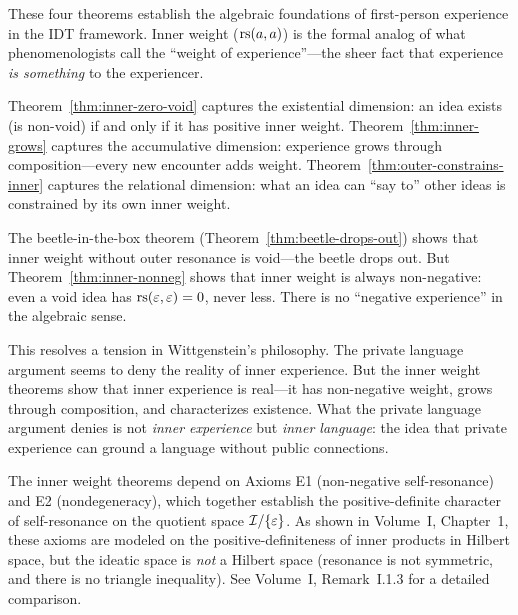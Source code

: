 \begin{interpretation}
These four theorems establish the algebraic foundations of first-person
experience in the IDT framework. Inner weight ($\mathrm{rs}(a, a)$) is the formal
analog of what phenomenologists call the ``weight of experience''---the
sheer fact that experience \emph{is something} to the experiencer.

Theorem~\ref{thm:inner-zero-void} captures the existential dimension: an
idea exists (is non-void) if and only if it has positive inner weight.
Theorem~\ref{thm:inner-grows} captures the accumulative dimension: experience
grows through composition---every new encounter adds weight.
Theorem~\ref{thm:outer-constrains-inner} captures the relational dimension:
what an idea can ``say to'' other ideas is constrained by its own inner weight.

The beetle-in-the-box theorem (Theorem~\ref{thm:beetle-drops-out}) shows
that inner weight without outer resonance is void---the beetle drops out.
But Theorem~\ref{thm:inner-nonneg} shows that inner weight is always
non-negative: even a void idea has $\mathrm{rs}(\varepsilon, \varepsilon) = 0$, never less.
There is no ``negative experience'' in the algebraic sense.

This resolves a tension in Wittgenstein's philosophy. The private language
argument seems to deny the reality of inner experience. But the inner weight
theorems show that inner experience is real---it has non-negative weight,
grows through composition, and characterizes existence. What the private
language argument denies is not \emph{inner experience} but \emph{inner
language}: the idea that private experience can ground a language without
public connections.
\end{interpretation}

\begin{remark}
The inner weight theorems depend on Axioms E1 (non-negative self-resonance)
and E2 (nondegeneracy), which together establish the positive-definite character
of self-resonance on the quotient space $\mathcal{I} / \{\varepsilon\}$. As shown in Volume~I,
Chapter~1, these axioms are modeled on the positive-definiteness of inner products
in Hilbert space, but the ideatic space is \emph{not} a Hilbert space (resonance is
not symmetric, and there is no triangle inequality). See Volume~I, Remark~I.1.3
for a detailed comparison.
\end{remark}



